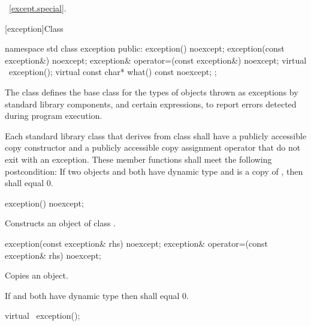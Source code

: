 \xref~\ref{except.special}.

[exception]{Class }

%
\begin{codeblock}
namespace std {
  class exception {
  public:
    exception() noexcept;
    exception(const exception&) noexcept;
    exception& operator=(const exception&) noexcept;
    virtual ~exception();
    virtual const char* what() const noexcept;
  };
}
\end{codeblock}

\pnum
The class
defines the base
class for the types of objects thrown as exceptions by
\Cpp standard library components, and certain
expressions, to report errors detected during program execution.

\pnum
Each standard library class  that derives from class  shall have a
publicly accessible copy constructor and a publicly accessible copy assignment
operator that do not exit with an exception. These member functions shall meet
the following postcondition: If two objects  and  both have
dynamic type  and  is a copy of , then
 shall equal 0.

%
\begin{itemdecl}
exception() noexcept;
\end{itemdecl}

\begin{itemdescr}
\pnum
\effects
Constructs an object of class
.
\end{itemdescr}

%
\begin{itemdecl}
exception(const exception& rhs) noexcept;
exception& operator=(const exception& rhs) noexcept;
\end{itemdecl}

\begin{itemdescr}
\pnum
\effects
Copies an
object.

\pnum
\postcondition If  and  both have dynamic type 
then  shall equal 0.
\end{itemdescr}

%
%
\begin{itemdecl}
virtual ~exception();
\end{itemdecl}

